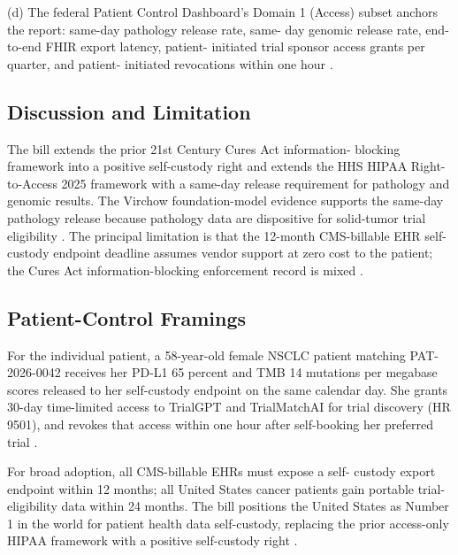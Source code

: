 (d) The federal Patient Control Dashboard's Domain 1 (Access)
subset anchors the report: same-day pathology release rate, same-
day genomic release rate, end-to-end FHIR export latency, patient-
initiated trial sponsor access grants per quarter, and patient-
initiated revocations within one hour
\cite{hhs_right_to_access_2025, astp_onc_hospital_apis_2024}.

\subsection{Discussion and Limitation}

The bill extends the prior 21st Century Cures Act information-
blocking framework into a positive self-custody right and extends
the HHS HIPAA Right-to-Access 2025 framework with a same-day
release requirement for pathology and genomic results. The Virchow
foundation-model evidence supports the same-day pathology release
because pathology data are dispositive for solid-tumor trial
eligibility \cite{rank1_cures_act_2016, onc_cures_act_final_rule_page,
vorontsov2024virchow, hhs_right_to_access_2025}. The principal
limitation is that the 12-month CMS-billable EHR self-custody
endpoint deadline assumes vendor support at zero cost to the
patient; the Cures Act information-blocking enforcement record is
mixed \cite{federal_register_info_blocking_disincentives_2024}.

\subsection{Patient-Control Framings}

For the individual patient, a 58-year-old female NSCLC patient
matching PAT-2026-0042 receives her PD-L1 65 percent and TMB 14
mutations per megabase scores released to her self-custody endpoint
on the same calendar day. She grants 30-day time-limited access to
TrialGPT and TrialMatchAI for trial discovery (HR 9501), and
revokes that access within one hour after self-booking her
preferred trial \cite{jin2024trialgpt, abdallah2026trialmatchai,
kawchak_2026_19119939}.

For broad adoption, all CMS-billable EHRs must expose a self-
custody export endpoint within 12 months; all United States cancer
patients gain portable trial-eligibility data within 24 months.
The bill positions the United States as Number 1 in the world for
patient health data self-custody, replacing the prior access-only
HIPAA framework with a positive self-custody right
\cite{kawchak_2026_19119939, kawchak_2026_19994945}.
